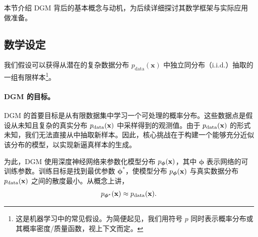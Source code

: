 本节介绍 DGM 背后的基本概念与动机，为后续详细探讨其数学框架与实际应用做准备。


\subsection{数学设定}\label{subsec:intro-math-setup}
我们假设可以获得从潜在的复杂数据分布 $ p_{\mathrm{data}}(\mathbf{x}) $ 中独立同分布（i.i.d.）抽取的一组有限样本\footnote{这是机器学习中的常见假设。为简便起见，我们用符号 $ p $ 同时表示概率分布或其概率密度/质量函数，视上下文而定。}。


\paragraph{DGM 的目标。}

DGM 的首要目标是从有限数据集中学习一个可处理的概率分布。这些数据点是假设从未知且复杂的真实分布 $p_{\mathrm{data}}({\mathbf{x}})$ 中采样得到的观测值。由于 $p_{\mathrm{data}}({\mathbf{x}})$ 的形式未知，我们无法直接从中抽取新样本。因此，核心挑战在于构建一个能够充分近似该分布的模型，以实现新逼真样本的生成。

为此，DGM 使用深度神经网络来参数化模型分布 $p_{\bm{\phi}}({\mathbf{x}})$，其中 $\bm{\phi}$ 表示网络的可训练参数。训练目标是找到最优参数 $\bm{\phi}^\ast$，使模型分布 $p_{\bm{\phi}}({\mathbf{x}})$ 与真实数据分布 $p_{\mathrm{data}}({\mathbf{x}})$ 之间的散度最小。从概念上讲，
\[
p_{{\bm{\phi}}^\ast}({\mathbf{x}}) \approx p_{\mathrm{data}}({\mathbf{x}}).
\]







